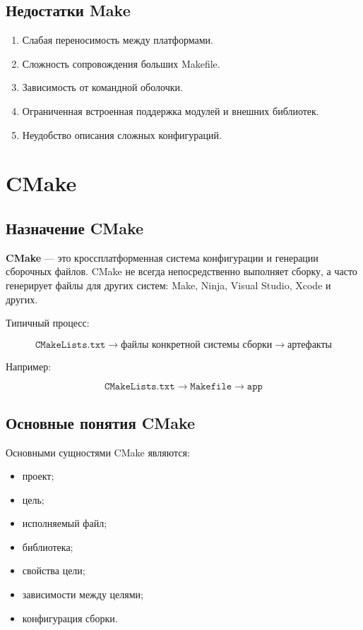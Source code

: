 \documentclass[12pt,a4paper]{article}
\begin{document}
\subsection{Недостатки Make}

\begin{enumerate}
    \item Слабая переносимость между платформами.
    \item Сложность сопровождения больших Makefile.
    \item Зависимость от командной оболочки.
    \item Ограниченная встроенная поддержка модулей и внешних библиотек.
    \item Неудобство описания сложных конфигураций.
\end{enumerate}

\section{CMake}

\subsection{Назначение CMake}

\textbf{CMake} --- это кроссплатформенная система конфигурации и генерации сборочных файлов. CMake не всегда непосредственно выполняет сборку, а часто генерирует файлы для других систем: Make, Ninja, Visual Studio, Xcode и других.

Типичный процесс:

\[
\texttt{CMakeLists.txt}
\longrightarrow
\text{файлы конкретной системы сборки}
\longrightarrow
\text{артефакты}
\]

Например:

\[
\texttt{CMakeLists.txt}
\longrightarrow
\texttt{Makefile}
\longrightarrow
\texttt{app}
\]

\subsection{Основные понятия CMake}

Основными сущностями CMake являются:
\begin{itemize}
    \item проект;
    \item цель;
    \item исполняемый файл;
    \item библиотека;
    \item свойства цели;
    \item зависимости между целями;
    \item конфигурация сборки.
\end{itemize}
\end{document}
